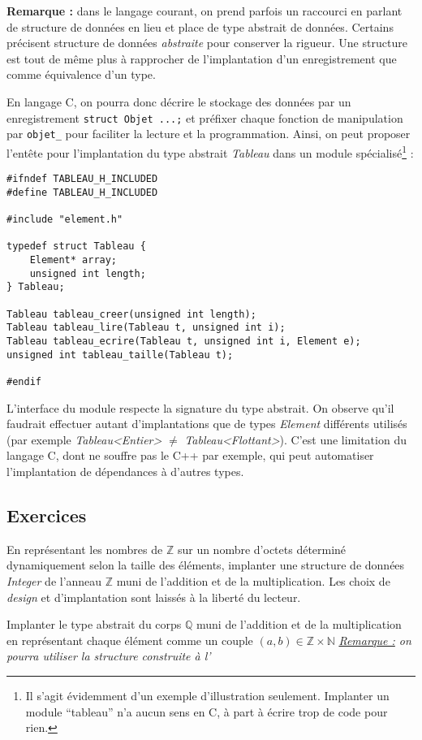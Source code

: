 \documentclass[../../../main.tex]{subfiles}
\begin{document}
\textbf{Remarque :} dans le langage courant, on prend parfois un raccourci en parlant de structure de données en lieu et place de type abstrait de données. Certains précisent structure de données \textit{abstraite} pour conserver la rigueur. Une structure est tout de même plus à rapprocher de l'implantation d'un enregistrement que comme équivalence d'un type.

En langage C, on pourra donc décrire le stockage des données par un enregistrement \texttt{struct Objet {...};} et préfixer chaque fonction de manipulation par \texttt{objet_} pour faciliter la lecture et la programmation. Ainsi, on peut proposer l'entête pour l'implantation du type abstrait \textit{Tableau} dans un module spécialisé\footnote{Il s'agit évidemment d'un exemple d'illustration seulement. Implanter un module ``tableau'' n'a aucun sens en C, à part à écrire trop de code pour rien.} :
\begin{verbatim}
#ifndef TABLEAU_H_INCLUDED
#define TABLEAU_H_INCLUDED

#include "element.h"

typedef struct Tableau {
	Element* array;
	unsigned int length;
} Tableau;

Tableau tableau_creer(unsigned int length);
Tableau tableau_lire(Tableau t, unsigned int i);
Tableau tableau_ecrire(Tableau t, unsigned int i, Element e);
unsigned int tableau_taille(Tableau t);

#endif
\end{verbatim}
L'interface du module respecte la signature du type abstrait. On observe qu'il faudrait effectuer autant d'implantations que de types \textit{Element} différents utilisés (par exemple \textit{Tableau\textless Entier\textgreater} $\neq$ \textit{Tableau\textless Flottant\textgreater}). C'est une limitation du langage C, dont ne souffre pas le C++ par exemple, qui peut automatiser l'implantation de dépendances à d'autres types.
\subsection{Exercices}
 En représentant les nombres de $\mathbb{Z}$ sur un nombre d'octets déterminé dynamiquement selon la taille des éléments, implanter une structure de données \textit{Integer} de l'anneau $\mathbb{Z}$ muni de l'addition et de la multiplication. Les choix de \textit{design} et d'implantation sont laissés à la liberté du lecteur.

 Implanter le type abstrait du corps $\mathbb{Q}$ muni de l'addition et de la multiplication en représentant chaque élément comme un couple $(a, b)\in\mathbb{Z}\times{\mathbb{N}}$ \newline
\textit{\underline{Remarque :} on pourra utiliser la structure construite à l'}
\end{document}
